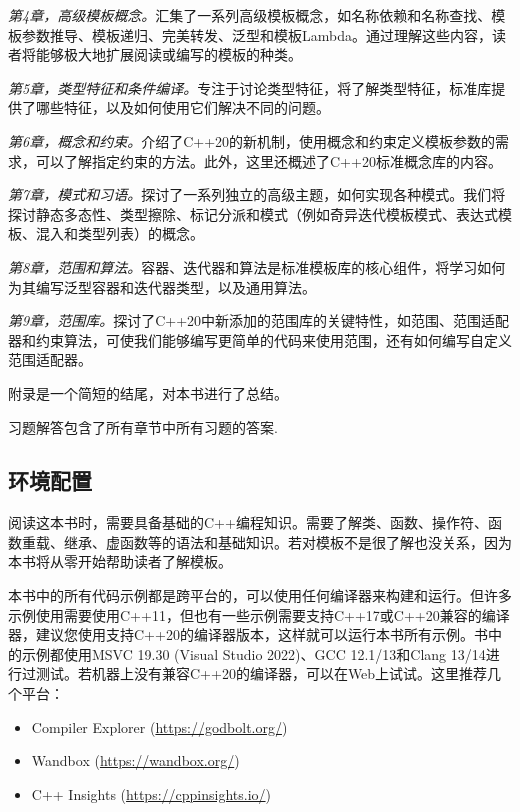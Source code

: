 \textit{第4章，高级模板概念。}汇集了一系列高级模板概念，如名称依赖和名称查找、模板参数推导、模板递归、完美转发、泛型和模板Lambda。通过理解这些内容，读者将能够极大地扩展阅读或编写的模板的种类。

\textit{第5章，类型特征和条件编译。}专注于讨论类型特征，将了解类型特征，标准库提供了哪些特征，以及如何使用它们解决不同的问题。

\textit{第6章，概念和约束。}介绍了C++20的新机制，使用概念和约束定义模板参数的需求，可以了解指定约束的方法。此外，这里还概述了C++20标准概念库的内容。

\textit{第7章，模式和习语。}探讨了一系列独立的高级主题，如何实现各种模式。我们将探讨静态多态性、类型擦除、标记分派和模式（例如奇异迭代模板模式、表达式模板、混入和类型列表）的概念。

\textit{第8章，范围和算法。}容器、迭代器和算法是标准模板库的核心组件，将学习如何为其编写泛型容器和迭代器类型，以及通用算法。

\textit{第9章，范围库。}探讨了C++20中新添加的范围库的关键特性，如范围、范围适配器和约束算法，可使我们能够编写更简单的代码来使用范围，还有如何编写自定义范围适配器。

附录是一个简短的结尾，对本书进行了总结。

习题解答包含了所有章节中所有习题的答案.

\subsection{环境配置}

阅读这本书时，需要具备基础的C++编程知识。需要了解类、函数、操作符、函数重载、继承、虚函数等的语法和基础知识。若对模板不是很了解也没关系，因为本书将从零开始帮助读者了解模板。

本书中的所有代码示例都是跨平台的，可以使用任何编译器来构建和运行。但许多示例使用需要使用C++11，但也有一些示例需要支持C++17或C++20兼容的编译器，建议您使用支持C++20的编译器版本，这样就可以运行本书所有示例。书中的示例都使用MSVC 19.30 (Visual Studio 2022)、GCC 12.1/13和Clang 13/14进行过测试。若机器上没有兼容C++20的编译器，可以在Web上试试。这里推荐几个平台：

\begin{itemize}
  \item Compiler Explorer (\url{https://godbolt.org/})
  \item Wandbox (\url{https://wandbox.org/})
  \item C++ Insights (\url{https://cppinsights.io/})
\end{itemize}

